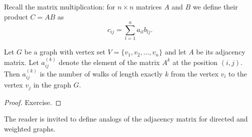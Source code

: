 \begin{page}
\setcounter{section}{1}
\setcounter{subsection}{4}
\setcounter{dfn}{12}
\label{portion:213}


Recall the matrix multiplication: for $n \times n$ matrices $A$ and $B$ we define their product $C = AB$ as
\[
c_{ij} = \sum_{l=1}^n a_{il} b_{lj}.
\]


\end{page}

\begin{page}
\setcounter{section}{1}
\setcounter{subsection}{4}
\setcounter{dfn}{13}
\label{portion:215}

\begin{thm}
Let $G$ be a graph with vertex set $V = \{v_1, v_2, \ldots, v_n\}$ and let $A$ be its adjacency matrix.
Let $a^{(k)}_{ij}$ denote the element of the matrix $A^k$ at the position $(i,j)$.
Then $a^{(k)}_{ij}$ is the number of walks of length exactly $k$ from the vertex $v_i$ to the vertex $v_j$ in the graph $G$.
\end{thm}

\end{page}

\begin{page}
\setcounter{section}{1}
\setcounter{subsection}{5}
\setcounter{dfn}{13}
\label{portion:216}

\begin{proof}
Exercise.
% 
\end{proof}

The reader is invited to define analogs of the adjacency matrix for directed and weighted graphs.



\end{page}

